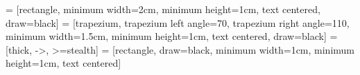 \usepackage{xcolor}
\usepackage{mathtools}

\usepackage{tikz}
\usetikzlibrary{shapes.geometric, arrows, positioning}

 = [rectangle, minimum width=2cm, minimum height=1cm, text centered, draw=black]
 = [trapezium, trapezium left angle=70, trapezium right angle=110, minimum width=1.5cm, minimum height=1cm, text centered, draw=black]
 = [thick, ->, >=stealth]
 = [rectangle, draw=black, minimum width=1cm, minimum height=1cm, text centered]

\usepackage{hyperref}
\hypersetup{
    colorlinks=true, %
    linktoc=all,     %
    linkcolor=GbBlueNt,    %
    citecolor=GbGreenNt,   %
    urlcolor=GbBlueDk      %
}

\usepackage{caption}
\usepackage{algorithm}
\usepackage{algpseudocode}

\newcommand{\Desc}[2]{\hspace*{\algorithmicindent} \makebox[14.5em][l]{#1}\parbox[t]{32em}{#2}}

\usepackage[style=iso]{datetime2}

\usepackage{float}
\let\origfigure\figure
\let\endorigfigure\endfigure
\renewenvironment{figure}[1][2] {
    \expandafter\origfigure\expandafter[H]
} {
    \endorigfigure
}

\renewcommand*\mod{\bmod}
\newcommand*\cat{\mathbin{+\mkern-10mu+}}
\newcommand*\bor{\mathbin{\&\mkern-7mu\&}}
\newcommand*\xor{\oplus}
\newcommand*\Bb{\mathbb{B}}
\newcommand*\Zb{\mathbb{Z}}
\newcommand*\Fb{\mathbb{F}}
\newcommand*\Nb{\mathbb{N}}
\newcommand*\Rb{\mathbb{R}}
\newcommand*\Eb{\mathbb{E}}
\newcommand*\Gb{\mathbb{G}}
\newcommand*\Ac{\mathcal{A}}
\newcommand*\Rc{\mathcal{R}}
\newcommand*\Oc{\mathcal{O}}
\newcommand*\Pc{\mathcal{P}}
\newcommand*\Vc{\mathcal{V}}
\newcommand*\Sc{\mathcal{S}}
\newcommand*\Hc{\mathcal{H}}
\newcommand*\algind{\hspace*{\algorithmicindent}}
\newcommand*\algindd{\algind \algind}
\renewcommand*\a{\alpha}
\renewcommand*\b{\beta}
\renewcommand*\d{\delta}
\newcommand*\e{\epsilon}
\renewcommand*\l{\lambda}
\newcommand*\p{\phi}
\renewcommand*\o{\omega}
\newcommand*\ps{\psi}
\renewcommand*\S{\Sigma}
\newcommand*\meq{\stackrel{?}{=}}
\newcommand{\qed}{\hfill \ensuremath{\Box}}
\newcommand{\defend}{\hfill \ensuremath{\triangle}}
\newcommand{\floor}[1]{\left \lfloor #1 \right \rfloor }
\newcommand{\ceil}[1]{\left \lceil #1 \right \rceil }
\renewcommand{\vec}[1]{ \boldsymbol{#1} }
\newcommand{\ran}[1]{ \mathrm{#1} }
\newcommand{\ranvec}[1]{ \boldsymbol{\ran{#1}} }
\newcommand{\dotp}[2]{ \langle #1, #2 \rangle }
\newcommand{\ip}[2]{ \langle #1, #2 \rangle }

